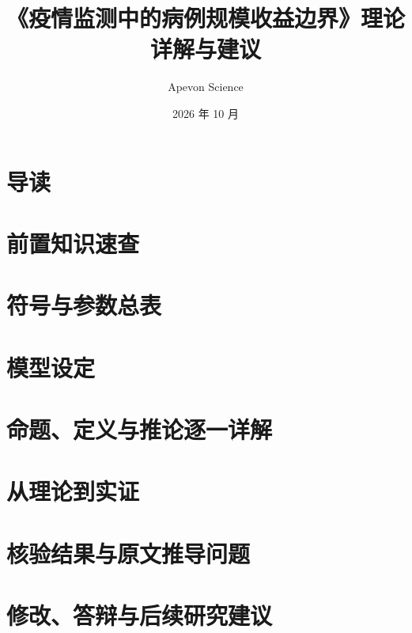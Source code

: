 \documentclass[fontset=none,10pt,a4paper]{ctexart}
\title{\textbf{《疫情监测中的病例规模收益边界》理论详解与建议}}
\author{Apevon Science}
\date{2026 年 10 月}
\theoremstyle{handout}
\begin{document}
\maketitle
\normalfont\mdseries



\clearpage
\tableofcontents
\clearpage

\setcounter{section}{-1}
\section{导读}\label{sec:guide}


\section{前置知识速查}\label{sec:prereq}


\section{符号与参数总表}\label{sec:symbols}


\section{模型设定}\label{sec:model}


\section{命题、定义与推论逐一详解}\label{sec:props}




\section{从理论到实证}\label{sec:empirical}


\section{核验结果与原文推导问题}\label{sec:checks}


\section{修改、答辩与后续研究建议}\label{sec:advice}


\appendix


\FloatBarrier
\clearpage


\end{document}
